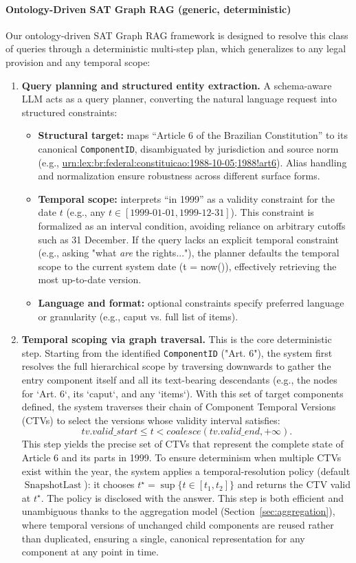 \documentclass[11pt]{article}
\begin{document}
\paragraph{Ontology-Driven SAT Graph RAG (generic, deterministic)}
Our ontology-driven SAT Graph RAG framework is designed to resolve this class of queries through a deterministic multi-step plan, which generalizes to any legal provision and any temporal scope:

\begin{enumerate}
\item \textbf{Query planning and structured entity extraction.}
A schema-aware LLM acts as a query planner, converting the natural language request into structured constraints:
\begin{itemize}
    \item \textbf{Structural target:} maps ``Article 6 of the Brazilian Constitution'' to its canonical \texttt{ComponentID}, disambiguated by jurisdiction and source norm (e.g., \url{urn:lex:br:federal:constituicao:1988-10-05;1988!art6}). Alias handling and normalization ensure robustness across different surface forms.
    \item \textbf{Temporal scope:} interprets ``in 1999'' as a validity constraint for the date $t$ (e.g., any $t \in [1999\text{-}01\text{-}01,1999\text{-}12\text{-}31]$). This constraint is formalized as an interval condition, avoiding reliance on arbitrary cutoffs such as 31 December. If the query lacks an explicit temporal constraint (e.g., asking "what \textit{are} the rights..."), the planner defaults the temporal scope to the current system date (t = now()), effectively retrieving the most up-to-date version.
    \item \textbf{Language and format:} optional constraints specify preferred language or granularity (e.g., caput vs. full list of items).
\end{itemize}

\item \textbf{Temporal scoping via graph traversal.}
 This is the core deterministic step. Starting from the identified \texttt{ComponentID} ("Art. 6"), the system first resolves the full hierarchical scope by traversing downwards to gather the entry component itself and all its text-bearing descendants (e.g., the nodes for `Art. 6`, its `caput`, and any `items`). With this set of target components defined, the system traverses their chain of Component Temporal Versions (CTVs) to select the versions whose validity interval satisfies:
\[
tv.valid\_start \leq t < coalesce(tv.valid\_end, +\infty).
\]
This step yields the precise set of CTVs that represent the complete state of Article 6 and its parts in 1999. To ensure determinism when multiple CTVs exist within the year, the system applies a temporal-resolution policy (default \(\operatorname{SnapshotLast}\)): it chooses \(t^\star=\sup\{t \in [t_1,t_2]\}\) and returns the CTV valid at \(t^\star\). The policy is disclosed with the answer.
This step is both efficient and unambiguous thanks to the aggregation model (Section~\ref{sec:aggregation}), where temporal versions of unchanged child components are reused rather than duplicated, ensuring a single, canonical representation for any component at any point in time.


\end{enumerate}
\end{document}
